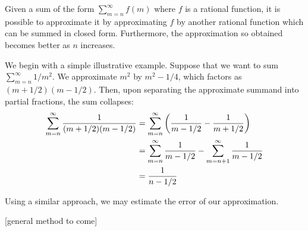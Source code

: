 \documentclass[12pt]{article}
\begin{document}
Given a sum of the form $\sum_{m=n}^\infty f(m)$ where $f$ is a rational
function, it is possible to approximate it by approximating $f$ by another
rational function which can be summed in closed form.  Furthermore, the
approximation so obtained becomes better as $n$ increases.

We begin with a simple illustrative example.  Suppose that we want to sum
$\sum_{m=n}^\infty 1/m^2$.  We approximate $m^2$ by $m^2 - 1/4$, which 
factors as $(m+1/2)(m-1/2)$.  Then, upon separating the approximate summand
into partial fractions, the sum collapses:
\begin{align*}
 \sum_{m=n}^\infty {1 \over (m+1/2)(m-1/2)} 
   &= \sum_{m=n}^\infty \left( {1 \over m-1/2} - {1 \over m+1/2} \right) \\
   &= \sum_{m=n}^\infty {1 \over m-1/2} -
      \sum_{m=n+1}^\infty {1 \over m-1/2} \\
   &= {1 \over n-1/2}
\end{align*}

Using a similar approach, we may estimate the error of our approximation.

[general method to come]
\end{document}
